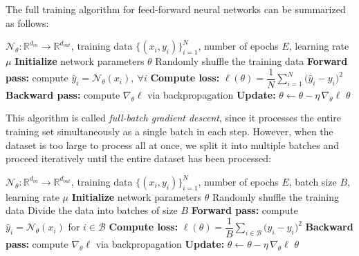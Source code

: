 

The full training algorithm for feed-forward neural networks can be summarized as follows:

\begin{algorithm}[H]
\caption{Full-Batch Gradient Descent}
\begin{algorithmic}[1]
    \Require $\mathcal{N}_{\theta}:\mathbb{R}^{d_{in}}\to\mathbb{R}^{d_{out}}$, training data $\{(x_i, y_i)\}_{i=1}^{N}$, number of epochs $E$, learning rate $\mu$
    \State \textbf{Initialize} network parameters $\theta$
        \State Randomly shuffle the training data
        \State \textbf{Forward pass:} compute $\hat{y}_i = \mathcal{N}_\theta(x_i), \:\forall i$
        \State \textbf{Compute loss:}
        $\ell(\theta) = \dfrac{1}{N}\displaystyle\sum_{i=1}^N
                \bigl(\hat{y}_i - y_i\bigr)^2$
        \State \textbf{Backward pass:} compute $\nabla_\theta \ell$ via backpropagation
        \State \textbf{Update:} $\theta \leftarrow \theta - \eta\,\nabla_\theta \ell$
    \EndFor
    \State \Return $\theta$
\end{algorithmic}
\end{algorithm}

This algorithm is called \emph{full-batch gradient descent}, since it processes the entire training set simultaneously as a single batch in each step.
However, when the dataset is too large to process all at once, we split it into multiple batches and proceed iteratively until the entire dataset has been processed:
\cite{goodfellow}


\begin{algorithm}[H]
\caption{Mini-Batch Gradient Descent}
\begin{algorithmic}[1]
    \Require $\mathcal{N}_{\theta}:\mathbb{R}^{d_{in}}\to\mathbb{R}^{d_{out}}$, training data $\{(x_i, y_i)\}_{i=1}^{N}$, number of epochs $E$, batch size $B$, learning rate $\mu$
    \State \textbf{Initialize} network parameters $\theta$
        \State Randomly shuffle the training data
        \State Divide the data into batches of size $B$
            \State \textbf{Forward pass:} compute $\hat{y}_i = \mathcal{N}_\theta(x_i)$ for $i\in\mathcal{B}$
            \State \textbf{Compute loss:}
            $\ell(\theta) = \dfrac{1}{B}\displaystyle\sum_{i\in\mathcal{B}}
                \bigl(\hat{y}_i - y_i\bigr)^2$
            \State \textbf{Backward pass:} compute $\nabla_\theta \ell$ via backpropagation
            \State \textbf{Update:} $\theta \leftarrow \theta - \eta\,\nabla_\theta \ell$
        \EndFor
    \EndFor
    \State \Return $\theta$
\end{algorithmic}
\end{algorithm}

